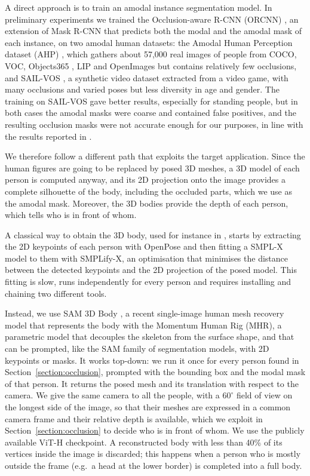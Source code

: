 \documentclass[11pt,a4paper]{article}
\begin{document}
A direct approach is to train an amodal instance segmentation model. In preliminary experiments we trained the Occlusion-aware R-CNN (ORCNN) \citep{orcnn}, an extension of Mask R-CNN that predicts both the modal and the amodal mask of each instance, on two amodal human datasets: the Amodal Human Perception dataset (AHP) \citep{AHPdataset}, which gathers about 57,000 real images of people from COCO, VOC, Objects365 \citep{shao2019objects365}, LIP and OpenImages but contains relatively few occlusions, and SAIL-VOS \citep{sailvos}, a synthetic video dataset extracted from a video game, with many occlusions and varied poses but less diversity in age and gender. The training on SAIL-VOS gave better results, especially for standing people, but in both cases the amodal masks were coarse and contained false positives, and the resulting occlusion masks were not accurate enough for our purposes, in line with the results reported in \citep{orcnn}.

We therefore follow a different path that exploits the target application. Since the human figures are going to be replaced by posed 3D meshes, a 3D model of each person is computed anyway, and its 2D projection onto the image provides a complete silhouette of the body, including the occluded parts, which we use as the amodal mask. Moreover, the 3D bodies provide the depth of each person, which tells who is in front of whom.

A classical way to obtain the 3D body, used for instance in \citep{tous2023}, starts by extracting the 2D keypoints of each person with OpenPose \citep{Openpose} and then fitting a SMPL-X model \citep{SMPL-X:2019} to them with SMPLify-X, an optimisation that minimises the distance between the detected keypoints and the 2D projection of the posed model. This fitting is slow, runs independently for every person and requires installing and chaining two different tools.

Instead, we use SAM 3D Body \citep{yang2026sam3dbody}, a recent single-image human mesh recovery model that represents the body with the Momentum Human Rig (MHR), a parametric model that decouples the skeleton from the surface shape, and that can be prompted, like the SAM family of segmentation models, with 2D keypoints or masks. It works top-down: we run it once for every person found in Section~\ref{section:occlusion}, prompted with the bounding box and the modal mask of that person. It returns the posed mesh and its translation with respect to the camera. We give the same camera to all the people, with a $60^\circ$ field of view on the longest side of the image, so that their meshes are expressed in a common camera frame and their relative depth is available, which we exploit in Section~\ref{section:occlusion} to decide who is in front of whom. We use the publicly available ViT-H checkpoint. A reconstructed body with less than 40\% of its vertices inside the image is discarded; this happens when a person who is mostly outside the frame (e.g.\ a head at the lower border) is completed into a full body.
\end{document}
